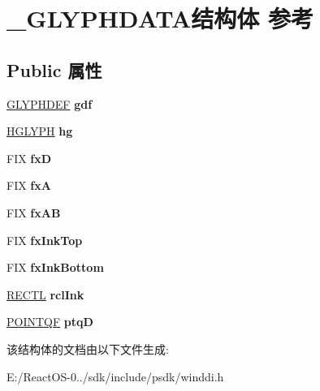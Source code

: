 \hypertarget{struct___g_l_y_p_h_d_a_t_a}{}\section{\+\_\+\+G\+L\+Y\+P\+H\+D\+A\+T\+A结构体 参考}
\label{struct___g_l_y_p_h_d_a_t_a}
\subsection*{Public 属性}
\begin{DoxyCompactItemize}
\item 
\mbox{\label{struct___g_l_y_p_h_d_a_t_a_a61393ba8ae0e7d3b9b4d58401f00d94e}} 
\hyperlink{union___g_l_y_p_h_d_e_f}{G\+L\+Y\+P\+H\+D\+EF} {\bfseries gdf}
\item 
\mbox{\label{struct___g_l_y_p_h_d_a_t_a_a12aa4f3ef28dcb61e3515319c5154981}} 
\hyperlink{interfacevoid}{H\+G\+L\+Y\+PH} {\bfseries hg}
\item 
\mbox{\label{struct___g_l_y_p_h_d_a_t_a_a971f24c540d88eff1cde5475181fd0a6}} 
F\+IX {\bfseries fxD}
\item 
\mbox{\label{struct___g_l_y_p_h_d_a_t_a_a66d4bf4832ac84ffa0fad61cb25aa27b}} 
F\+IX {\bfseries fxA}
\item 
\mbox{\label{struct___g_l_y_p_h_d_a_t_a_a449b5270839191f354a00fd0b0bbe7ea}} 
F\+IX {\bfseries fx\+AB}
\item 
\mbox{\label{struct___g_l_y_p_h_d_a_t_a_ae87b6c4e8b6fe21d26d17113cdf4fa75}} 
F\+IX {\bfseries fx\+Ink\+Top}
\item 
\mbox{\label{struct___g_l_y_p_h_d_a_t_a_a8f3a70f01ddbe1c04511c548cd1a476e}} 
F\+IX {\bfseries fx\+Ink\+Bottom}
\item 
\mbox{\label{struct___g_l_y_p_h_d_a_t_a_a470dbffb1a693007146b5afe319fd593}} 
\hyperlink{struct___r_e_c_t_l}{R\+E\+C\+TL} {\bfseries rcl\+Ink}
\item 
\mbox{\label{struct___g_l_y_p_h_d_a_t_a_afe1016f5b31c32a89001e13ce4011f75}} 
\hyperlink{struct___p_o_i_n_t_q_f}{P\+O\+I\+N\+T\+QF} {\bfseries ptqD}
\end{DoxyCompactItemize}


该结构体的文档由以下文件生成\+:\begin{DoxyCompactItemize}
\item 
E\+:/\+React\+O\+S-\/0../sdk/include/psdk/winddi.\+h\end{DoxyCompactItemize}

